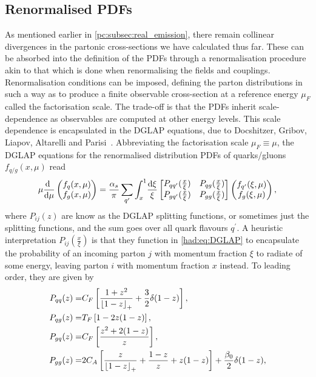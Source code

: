 \documentclass[../main.tex]{subfiles}
\begin{document}
\subsection{Renormalised PDFs}
As mentioned earlier in \cref{pc:subsec:real_emission}, there remain collinear divergences in the partonic cross-sections we have calculated thus far.
These can be absorbed into the definition of the PDFs through a renormalisation procedure akin to that which is done when renormalising the fields and couplings.
Renormalisation conditions can be imposed, defining the parton distributions in such a way as to produce a finite observable cross-section at a reference energy \(\mu_F\) called the factorisation scale.
The trade-off is that the PDFs inherit scale-dependence as observables are computed at other energy levels.
This scale dependence is encapsulated in the DGLAP equations, due to Docshitzer, Gribov, Liapov, Altarelli and Parisi~\cite{DGLAP-D,DGLAP-GL,Altarelli:1977zs}.
Abbreviating the factorisation scale \(\mu_F \equiv \mu\), the DGLAP equations for the renormalised distribution PDFs of quarks/gluons \(f_{q/g}(x, \mu)\) read
\begin{equation}
  \label{had:eq:DGLAP}
  \mu \d[\mu]\ \begin{pmatrix} f_q(x, \mu) \\ f_g(x, \mu) \end{pmatrix} = \frac{\alpha_s}{\pi} \sum_{q^\prime} \int_x^1 \! \frac{\mathrm{d}\xi}{\xi} \begin{bmatrix} P_{qq^\prime}(\frac{x}{\xi}) & P_{qg}(\frac{x}{\xi}) \\ P_{gq^\prime}(\frac{x}{\xi}) & P_{gg}(\frac{x}{\xi}) \end{bmatrix} \begin{pmatrix}
    f_{q^\prime}(\xi, \mu) \\ f_g(\xi, \mu)
  \end{pmatrix},
\end{equation}
where \(P_{ij}(z)\) are know as the DGLAP splitting functions, or sometimes just the splitting functions, and the sum goes over all quark flavours \(q^\prime\).
A heuristic interpretation \(P_{ij}(\frac{x}{\xi})\) is that they function in \cref{had:eq:DGLAP} to encapsulate the probability of an incoming parton \(j\) with momentum fraction \(\xi\) to radiate of some energy, leaving parton \(i\) with momentum fraction \(x\) instead.
To leading order, they are given by~\cite{Schwartz:2014sze}
\begin{subequations}
  \begin{align}
    P_{qq}(z) = & C_F \left[\frac{1+z^2}{\left\lfloor 1-z \right\rfloor_+} + \frac{3}{2} \delta(1-z)\right],                             \\
    P_{qg}(z) = & T_F \left[1 - 2z(1-z)\right],                                                                        \\
    P_{gq}(z) = & C_F \left[\frac{z^2 + 2(1-z)}{z}\right],                                                             \\
    P_{gg}(z) = & 2C_A \left[\frac{z}{\left\lfloor 1-z \right\rfloor_+} + \frac{1-z}{z} + z(1-z)\right] + \frac{\beta_0}{2} \delta(1-z),
  \end{align}
\end{subequations}
\end{document}
